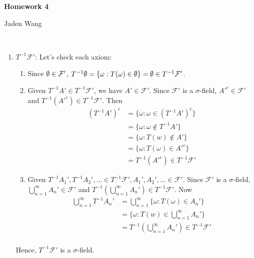 \documentclass[12pt]{article}
\begin{document}
\centerline {\textsf{\textbf{\LARGE{Homework 4}}}}
\centerline {Jaden Wang}
\vspace{.15in}

\begin{problem}[1]
~\begin{enumerate}[label=\alph*)]
	\item $ T^{-1}\mathcal{F}'$: Let's check each axiom:
		\begin{enumerate}[label=(\roman*)]
			\item Since $ \emptyset \in \mathcal{F}'$, $ T^{-1} \emptyset = \{\omega: T(\omega) \in \emptyset\} = \emptyset \in T^{-1} \mathcal{F}' $.
			\item Given $ T^{-1}A' \in T^{-1}\mathcal{F}'$, we have $ A' \in \mathcal{F}'$. Since $ \mathcal{F}'$ is a $\sigma$-field, $ A'^{c} \in \mathcal{F}'$ and $ T^{-1}(A'^{c}) \in T^{-1}\mathcal{F}'$. Then
				\begin{align*}
					(T^{-1}A')^{c} &= \{\omega:\omega \in (T^{-1}A')^{c}\}  \\
					&= \{\omega:\omega \not\in T^{-1}A'\}  \\
					&= \{\omega: T(w) \not\in A'\}  \\
					&= \{\omega:T(\omega) \in A'^{c}\}  \\
					&= T^{-1}(A'^{c}) \in T^{-1}\mathcal{F}'
				\end{align*}
			\item Given $ T^{-1}A_1', T^{-1}A_2',\ldots \in T^{-1}\mathcal{F}', A_1',A_2',\ldots \in \mathcal{F}'$. Since $ \mathcal{F}'$ is a $\sigma$-field, $ \bigcup_{ n =1}^{\infty} A_n' \in \mathcal{F}'$ and $ T^{-1}\left( \bigcup_{ n =1}^{\infty} A_n' \right) \in T^{-1}\mathcal{F}' $. Now
				\begin{align*}
					\bigcup_{ n =1}^{\infty} T^{-1} A_n' &= \bigcup_{ n =1}^{\infty} \{\omega: T( \omega) \in A_n'\}  \\
									     &= \{\omega: T(w) \in \bigcup_{ n =1}^{\infty} A_n'\}  \\
									     &= T^{-1} \left( \bigcup_{ n =1}^{\infty} A_n' \right) \in T^{-1}\mathcal{F}' \\
				\end{align*}
		\end{enumerate}
		Hence, $ T^{-1} \mathcal{F}'$ is a $\sigma$-field.


\end{enumerate}
\end{problem}
\end{document}
